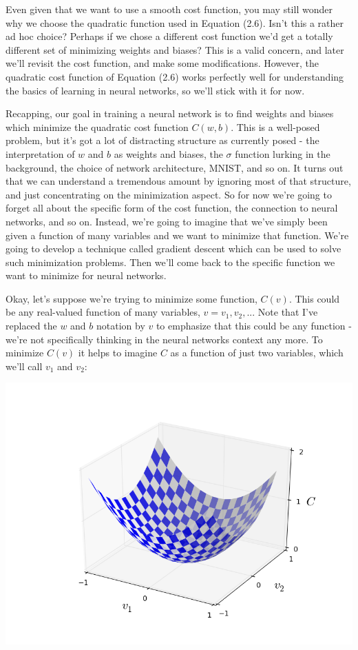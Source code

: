 \documentclass[a4paper,12pt]{report}%
\begin{document}
Even given that we want to use a smooth cost function, you may still wonder why we choose the quadratic function used in Equation (2.6). Isn't this a rather ad hoc choice? Perhaps if we chose a different cost function we'd get a totally different set of minimizing weights and biases? This is a valid concern, and later we'll revisit the cost function, and make some modifications. However, the quadratic cost function of Equation (2.6) works perfectly well for understanding the basics of learning in neural networks, so we'll stick with it for now.

Recapping, our goal in training a neural network is to find weights and biases which minimize the quadratic cost function $C(w,b)$. This is a well-posed problem, but it's got a lot of distracting structure as currently posed - the interpretation of $w$ and $b$ as weights and biases, the $\sigma$ function lurking in the background, the choice of network architecture, MNIST, and so on. It turns out that we can understand a tremendous amount by ignoring most of that structure, and just concentrating on the minimization aspect. So for now we're going to forget all about the specific form of the cost function, the connection to neural networks, and so on. Instead, we're going to imagine that we've simply been given a function of many variables and we want to minimize that function. We're going to develop a technique called gradient descent which can be used to solve such minimization problems. Then we'll come back to the specific function we want to minimize for neural networks.

Okay, let's suppose we're trying to minimize some function, $C(v)$. This could be any real-valued function of many variables, $v = v_{1}, v_{2}, ...$ Note that I've replaced the $w$ and $b$ notation by $v$ to emphasize that this could be any function - we're not specifically thinking in the neural networks context any more. To minimize $C(v)$ it helps to imagine $C$ as a function of just two variables, which we'll call $v_{1}$ and $v_{2}$:
\begin{center}
 \includegraphics[width=0.85\linewidth]{images/valley.png}
\end{center}
\end{document}
